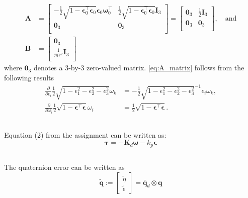 \begin{align}
\label{eq:A_matrix}
\mathbf{A}
&= \begin{bmatrix}
-\frac{1}{2}\sqrt{1-\boldsymbol{\epsilon}_0^\top\boldsymbol{\epsilon}_0}\boldsymbol{\epsilon}_0\boldsymbol{\omega}_0^\top & \frac{1}{2}\sqrt{1-\boldsymbol{\epsilon}_0^\top\boldsymbol{\epsilon}_0}\mathbf{I}_3\\
\mathbf{0}_3 & \mathbf{0}_3 \\
\end{bmatrix}
= \begin{bmatrix}
\mathbf{0}_3 & \frac{1}{2}\mathbf{I}_3 \\
\mathbf{0}_3 & \mathbf{0}_3 \\
\end{bmatrix}, \quad \text{and} \\
\mathbf{B}
\label{eq:B_matrix}
&= \begin{bmatrix}
\mathbf{0}_3\\
\frac{1}{mr^2}\mathbf{I}_3\\
\end{bmatrix}
\end{align}
where $\mathbf{0}_3$ denotes a 3-by-3 zero-valued matrix. \eqref{eq:A_matrix} follows from the following results
\begin{align}
\frac{\partial}{\partial \epsilon_i}\frac{1}{2}\sqrt{1-\epsilon_1^2 - \epsilon_2^2 - \epsilon_3^2}\omega_k
&= -\frac{1}{2}\sqrt{1-\epsilon_1^2 - \epsilon_2^2 - \epsilon_3^2}^{-1}\epsilon_i \omega_k, \\
\frac{\partial}{\partial \omega_i}\frac{1}{2}\sqrt{1-\boldsymbol{\epsilon}^\top\boldsymbol{\epsilon}}\omega_i
&=\frac{1}{2}\sqrt{1-\boldsymbol{\epsilon}^\top\boldsymbol{\epsilon}}.
\end{align}


\subsection{}

\subsection{}
Equation (2) from the assignment can be written as:
\begin{equation}
  \label{eq:tau}
  \mathbf{\tau} = -\mathbf{K}_d \boldsymbol{\omega} - k_p \boldsymbol{\epsilon}
\end{equation}

\subsection{}
The quaternion error can be written as
 \begin{equation}
	 \tilde{\mathbf{q}} := \left[
	 \begin{array}{c}
		 \tilde{\eta} \\
		 \tilde{\epsilon}
	 \end{array}
	 \right] = \bar{\mathbf{q}}_d \otimes \mathbf{q}
 \end{equation}

